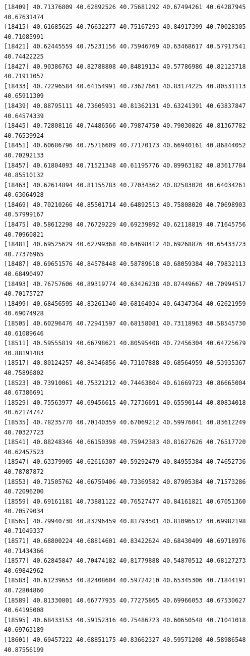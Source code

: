 \documentclass[
  letterpaper,
  DIV=11,
  numbers=noendperiod]{scrartcl}
\begin{document}
\begin{verbatim}
[18409] 40.71376809 40.62892526 40.75681292 40.67494261 40.64287945 40.67631474
[18415] 40.61685625 40.76632277 40.75167293 40.84917399 40.70028305 40.71085991
[18421] 40.62445559 40.75231156 40.75946769 40.63468617 40.57917541 40.74422225
[18427] 40.90386763 40.82788808 40.84819134 40.57786986 40.82123718 40.71911057
[18433] 40.72296584 40.64154991 40.73627661 40.83174225 40.80531113 40.65911309
[18439] 40.88795111 40.73605931 40.81362131 40.63241391 40.63837847 40.64574339
[18445] 40.72808116 40.74486566 40.79874750 40.79030826 40.81367782 40.76539924
[18451] 40.60686796 40.75716609 40.77170173 40.66940161 40.86844052 40.70292133
[18457] 40.61804093 40.71521348 40.61195776 40.89963182 40.83617784 40.85510132
[18463] 40.62614894 40.81155783 40.77034362 40.82583020 40.64034261 40.63064928
[18469] 40.70210266 40.85501714 40.64892513 40.75808020 40.70698903 40.57999167
[18475] 40.58612298 40.76729229 40.69239892 40.62118819 40.71645756 40.70960821
[18481] 40.69525629 40.62799368 40.64698412 40.69268876 40.65433723 40.77376965
[18487] 40.69651576 40.84578448 40.58789618 40.68059384 40.79832113 40.68490497
[18493] 40.76757606 40.89319774 40.63426238 40.87449667 40.70994517 40.70175727
[18499] 40.68456595 40.83261340 40.68164034 40.64347364 40.62621959 40.69074928
[18505] 40.60296476 40.72941597 40.68158081 40.73118963 40.58545730 40.61089646
[18511] 40.59555819 40.66798621 40.80595408 40.72456304 40.64725679 40.88191483
[18517] 40.80124257 40.84346856 40.73107888 40.68564959 40.53935367 40.75896802
[18523] 40.73910061 40.75321212 40.74463804 40.61669723 40.86665004 40.67386691
[18529] 40.75563977 40.69456615 40.72736691 40.65590144 40.80834018 40.62174747
[18535] 40.78235770 40.70140359 40.67069212 40.59976041 40.83612249 40.70327723
[18541] 40.88248346 40.66150398 40.75942383 40.81627626 40.76517720 40.62457523
[18547] 40.63379905 40.62616307 40.59292479 40.84955384 40.74652736 40.78787872
[18553] 40.71505762 40.66759406 40.73369582 40.87905384 40.71573286 40.72096200
[18559] 40.69161181 40.73881122 40.76527477 40.84161821 40.67051360 40.70579034
[18565] 40.79940730 40.83296459 40.81793501 40.81096512 40.69982198 40.71049337
[18571] 40.68800224 40.68814601 40.83422624 40.68430409 40.69718976 40.71434366
[18577] 40.62845847 40.70474182 40.81779888 40.54870512 40.68127273 40.69842962
[18583] 40.61239653 40.82408604 40.59724210 40.65345306 40.71844191 40.72804860
[18589] 40.81330801 40.66777935 40.77275865 40.69966053 40.67530627 40.64195008
[18595] 40.68433153 40.59152316 40.75486723 40.60650548 40.71041018 40.69763189
[18601] 40.69457222 40.68851175 40.83662327 40.59571208 40.58986548 40.87556199

\end{verbatim}
\end{document}
